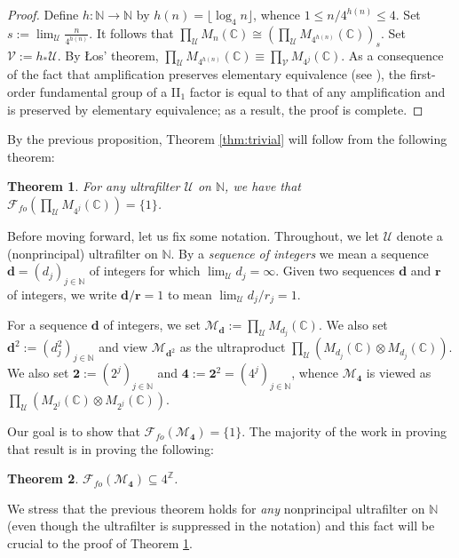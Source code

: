 \documentclass[12pt]{amsart}
\numberwithin{equation}{section}
\newtheorem{thm}{Theorem}[section]
\theoremstyle{definition}
\newcommand{\C}{\mathbb{C}}
\newcommand{\N}{\mathbb{N}}
\newcommand{\Z}{\mathbb{Z}}
\def\bb{\mathbb}
\def\cal{\mathcal}
\def\M{\mathcal{M}}
\newcommand\cU{{\cal U}}
\def \M{\mathcal{M}}
\def \two{\mathbf{2}}
\def \boldd{\mathbf{d}}
\begin{document}
\begin{proof}
Define $h:\N\to \N$ by $h(n)=\lfloor \log_4 n\rfloor$, whence $1\leq n/4^{h(n)}\leq 4$.  Set $s:=\lim_\cU \frac{n}{4^{h(n)}}$.  It follows that $\prod_\cU M_{n}(\C)\cong (\prod_\cU M_{4^{h(n)}}(\C))_s$.  Set $\mathcal{V}:=h_*\cU$. By \L os' theorem, $\prod_\cU M_{4^{h(n)}}(\C)\equiv \prod_{\mathcal{V}}M_{4^j}(\C)$. As a consequence of the fact that amplification preserves elementary equivalence (see \cite[Lemma 2.5]{goldbring2023first}), the first-order fundamental group of a II$_1$ factor is equal to that of any amplification and is preserved by elementary equivalence; as a result, the proof is complete.  
\end{proof}

By the previous proposition, Theorem \ref{thm:trivial} will follow from the following theorem:

\begin{thm}\label{thm:trivialfour}
For any ultrafilter $\cU$ on $\N$, we have that $\mathcal{F}_{fo}(\prod_\cU M_{4^j}(\C))=\{1\}$.
\end{thm}

Before moving forward, let us fix some notation.  Throughout, we let $\cU$ denote a (nonprincipal) ultrafilter on $\bb N$.  By a \emph{sequence of integers} we mean a sequence $\mathbf{d}=(d_j)_{j\in \N}$ of integers for which $\lim_\cU d_j=\infty$.  Given two sequences $\mathbf{d}$ and $\mathbf{r}$ of integers, we write $\mathbf{d}/\mathbf{r}=1$ to mean $\lim_{\cU}d_j/r_j=1$.  

For a sequence $\mathbf{d}$ of integers, we set $\M_\boldd:=\prod_\cU M_{d_j}(\C)$.  We also set $\boldd^2:=(d_j^2)_{j\in \N}$ and view $\M_{\boldd^2}$ as the ultraproduct $\prod_\cU (M_{d_j}(\C)\otimes M_{d_j}(\C))$.  We also set $\two:=(2^j)_{j\in \N}$ and $\mathbf{4}:=\mathbf{2}^2=(4^j)_{j\in \N}$, whence $\M_\mathbf{4}$ is viewed as $\prod_\cU (M_{2^j}(\C)\otimes M_{2^j}(\C))$.  

Our goal is to show that $\mathcal{F}_{fo}(\M_{\mathbf{4}})=\{1\}$.  The majority of the work in proving that result is in proving the following:

\begin{thm}\label{thm:maintheorem}
$\mathcal{F}_{fo}(\M_{\mathbf{4}})\subseteq 4^\Z$.
\end{thm}

We stress that the previous theorem holds for \emph{any} nonprincipal ultrafilter on $\bb N$ (even though the ultrafilter is suppressed in the notation) and this fact will be crucial to the proof of Theorem \ref{thm:trivialfour}.
\end{document}
